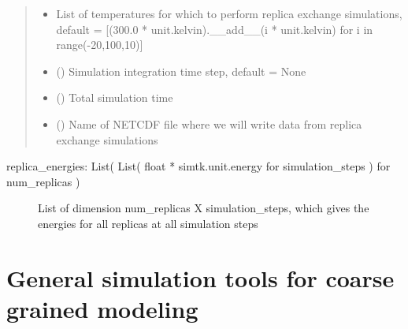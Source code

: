 \documentclass[letterpaper,12pt,english,openany,oneside]{sphinxmanual}
\begin{document}
\begin{fulllineitems}
\begin{quote}
\begin{description}
\begin{itemize}
\item {} 
 \textendash{} List of temperatures for which to perform replica exchange simulations, default = {[}(300.0 * unit.kelvin).\_\_add\_\_(i * unit.kelvin) for i in range(-20,100,10){]}

\item {} 
 () \textendash{} Simulation integration time step, default = None

\item {} 
 () \textendash{} Total simulation time

\item {} 
 () \textendash{} Name of NETCDF file where we will write data from replica exchange simulations

\end{itemize}

\end{description}\end{quote}
\begin{description}
\item[{replica\_energies: List( List( float * simtk.unit.energy for simulation\_steps ) for num\_replicas )}] \leavevmode
List of dimension num\_replicas X simulation\_steps, which gives the energies for all replicas at all simulation steps

\end{description}

\end{fulllineitems}



\section{General simulation tools for coarse grained modeling}
\label{\detokenize{simulation:module-simulation.tools}}\label{\detokenize{simulation:general-simulation-tools-for-coarse-grained-modeling}}
\end{document}
